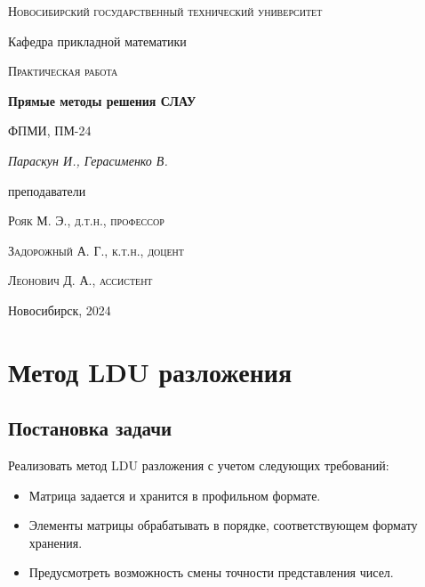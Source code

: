 \documentclass[12pt, a4paper]{article}
\begin{document}
\begin{titlepage}
  \centering
  \textsc{Новосибирский государственный технический университет}\par
  \vspace{1mm}
  Кафедра прикладной математики\par
  \vspace{4cm}
  \textsc{Практическая работа }\par
  {\huge\bfseries Прямые методы решения СЛАУ\par}
  \vspace{1cm}
  {\scriptsize ФПМИ, ПМ-24\par}
  \vspace{1mm}
  {\itshape\large Параскун И., Герасименко В.\par}
  \vfill
  {\small преподаватели\par}
  \vspace{2mm}
  \textsc{Рояк М. Э., д.т.н., профессор}\par
  \vspace{1mm}
  \textsc{Задорожный А. Г., к.т.н., доцент}\par
  \vspace{1mm}
  \textsc{Леонович Д. А., ассистент}\par
  \vfill
  \large{Новосибирск, 2024}
\end{titlepage}

\newpage

\setcounter{page}{2}
\tableofcontents

\newpage

\section{Метод LDU разложения}
\subsection{Постановка задачи}
Реализовать метод LDU разложения с учетом следующих требований:

\begin{itemize}
  \item Матрица задается и хранится в профильном формате.
  \item Элементы матрицы обрабатывать в порядке, соответствующем 
    формату хранения.
  \item Предусмотреть возможность смены точности представления чисел.
\end{itemize}
\end{document}
